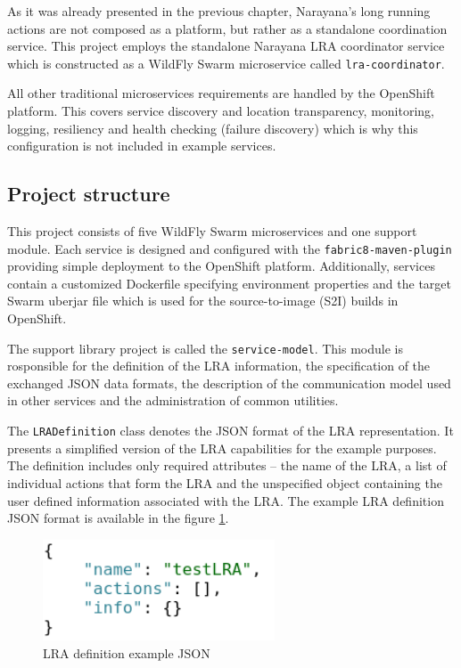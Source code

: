 \documentclass[oneside,
  digital, %
  table,   %
  nolof,     %
  nolot,     %
]{fithesis3}
\begin{document}
As it was already presented in the previous chapter, Narayana's long running actions are not composed as a platform, but rather as a standalone coordination service. This project employs the standalone Narayana LRA coordinator service which is constructed as a WildFly Swarm microservice called \texttt{lra-coordinator}. 

All other traditional microservices requirements are handled by the OpenShift platform. This covers service discovery and location transparency, monitoring, logging, resiliency and health checking (failure discovery) which is why this configuration is not included in example services.


\subsection{Project structure}

This project consists of five WildFly Swarm microservices and one support module. Each service is designed and configured with the \texttt{fabric8-maven-plugin} providing simple deployment to the OpenShift platform. Additionally, services contain a customized Dockerfile specifying environment properties and the target Swarm uberjar file which is used for the source-to-image (S2I) builds in OpenShift.

The support library project is called the \texttt{service-model}. This module is rosponsible for the definition of the LRA information, the specification of the exchanged JSON data formats, the description of the communication model used in other services and the administration of common utilities.

The \texttt{LRADefinition} class denotes the JSON format of the LRA representation. It presents a simplified version of the LRA capabilities for the example purposes. The definition includes only required attributes -- the name of the LRA, a list of individual actions that form the LRA and the unspecified object containing the user defined information associated with the LRA. The example LRA definition JSON format is available in the figure \ref{fig:lra-json}.

\begin{figure}[h]
    \begin{center}
        \includegraphics[height=30mm]{images/LRADefinition.png}
    \end{center}
    \caption{LRA definition example JSON}
    \label{fig:lra-json}
\end{figure}
\end{document}

